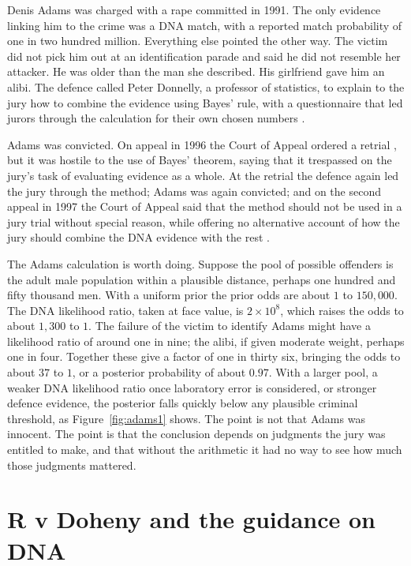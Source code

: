Denis Adams was charged with a rape committed in 1991. The only evidence linking him to the crime was a DNA match, with a reported match probability of one in two hundred million. Everything else pointed the other way. The victim did not pick him out at an identification parade and said he did not resemble her attacker. He was older than the man she described. His girlfriend gave him an alibi. The defence called Peter Donnelly, a professor of statistics, to explain to the jury how to combine the evidence using Bayes' rule, with a questionnaire that led jurors through the calculation for their own chosen numbers \citep{donnelly2005}.

Adams was convicted. On appeal in 1996 the Court of Appeal ordered a retrial \citep{adams1996}, but it was hostile to the use of Bayes' theorem, saying that it trespassed on the jury's task of evaluating evidence as a whole. At the retrial the defence again led the jury through the method; Adams was again convicted; and on the second appeal in 1997 the Court of Appeal said that the method should not be used in a jury trial without special reason, while offering no alternative account of how the jury should combine the DNA evidence with the rest \citep{adams1998}.

The Adams calculation is worth doing. Suppose the pool of possible offenders is the adult male population within a plausible distance, perhaps one hundred and fifty thousand men. With a uniform prior the prior odds are about $1$ to $150{,}000$. The DNA likelihood ratio, taken at face value, is $2\times 10^8$, which raises the odds to about $1{,}300$ to $1$. The failure of the victim to identify Adams might have a likelihood ratio of around one in nine; the alibi, if given moderate weight, perhaps one in four. Together these give a factor of one in thirty six, bringing the odds to about $37$ to $1$, or a posterior probability of about $0.97$. With a larger pool, a weaker DNA likelihood ratio once laboratory error is considered, or stronger defence evidence, the posterior falls quickly below any plausible criminal threshold, as Figure~\ref{fig:adams1} shows. The point is not that Adams was innocent. The point is that the conclusion depends on judgments the jury was entitled to make, and that without the arithmetic it had no way to see how much those judgments mattered.

\section{R v Doheny and the guidance on DNA}

